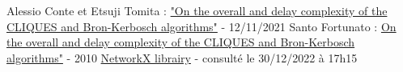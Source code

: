 \documentclass[a4paper, 12pt]{article}
\begin{document}

\newpage
\begin{thebibliography}{unsrt}
 Alessio Conte et Etsuji Tomita :  \href{https://doi.org/10.1016/j.tcs.2021.11.005}{"On the overall and delay complexity of the CLIQUES and Bron-Kerbosch algorithms"} -  12/11/2021
 Santo Fortunato : \href{https://doi.org/10.1016/j.physrep.2009.11.002}{\og On the overall and delay complexity of the CLIQUES and Bron-Kerbosch algorithms"} - 2010
 \href{https://networkx.org}{NetworkX librairy} - consulté le 30/12/2022 à 17h15
\end{thebibliography}
\end{document}
